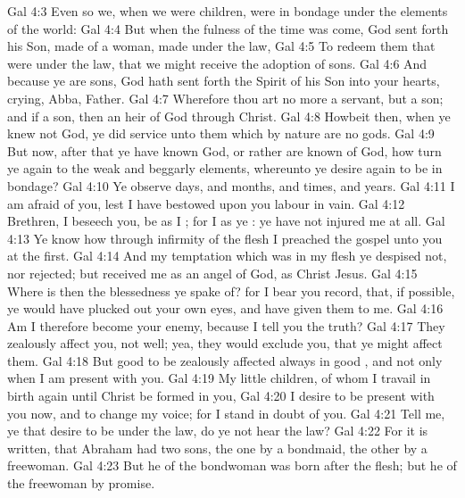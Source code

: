 \vs Gal 4:3 Even so we, when we were children, were in bondage under the elements of the world:
\vs Gal 4:4 But when the fulness of the time was come, God sent forth his Son, made of a woman, made under the law,
\vs Gal 4:5 To redeem them that were under the law, that we might receive the adoption of sons.
\vs Gal 4:6 And because ye are sons, God hath sent forth the Spirit of his Son into your hearts, crying, Abba, Father.
\vs Gal 4:7 Wherefore thou art no more a servant, but a son; and if a son, then an heir of God through Christ.
\vs Gal 4:8 Howbeit then, when ye knew not God, ye did service unto them which by nature are no gods.
\vs Gal 4:9 But now, after that ye have known God, or rather are known of God, how turn ye again to the weak and beggarly elements, whereunto ye desire again to be in bondage?
\vs Gal 4:10 Ye observe days, and months, and times, and years.
\vs Gal 4:11 I am afraid of you, lest I have bestowed upon you labour in vain.
\vs Gal 4:12 Brethren, I beseech you, be as I ; for I  as ye : ye have not injured me at all.
\vs Gal 4:13 Ye know how through infirmity of the flesh I preached the gospel unto you at the first.
\vs Gal 4:14 And my temptation which was in my flesh ye despised not, nor rejected; but received me as an angel of God,  as Christ Jesus.
\vs Gal 4:15 Where is then the blessedness ye spake of? for I bear you record, that, if  possible, ye would have plucked out your own eyes, and have given them to me.
\vs Gal 4:16 Am I therefore become your enemy, because I tell you the truth?
\vs Gal 4:17 They zealously affect you,  not well; yea, they would exclude you, that ye might affect them.
\vs Gal 4:18 But  good to be zealously affected always in  good , and not only when I am present with you.
\vs Gal 4:19 My little children, of whom I travail in birth again until Christ be formed in you,
\vs Gal 4:20 I desire to be present with you now, and to change my voice; for I stand in doubt of you.
\vs Gal 4:21 Tell me, ye that desire to be under the law, do ye not hear the law?
\vs Gal 4:22 For it is written, that Abraham had two sons, the one by a bondmaid, the other by a freewoman.
\vs Gal 4:23 But he  of the bondwoman was born after the flesh; but he of the freewoman  by promise.
